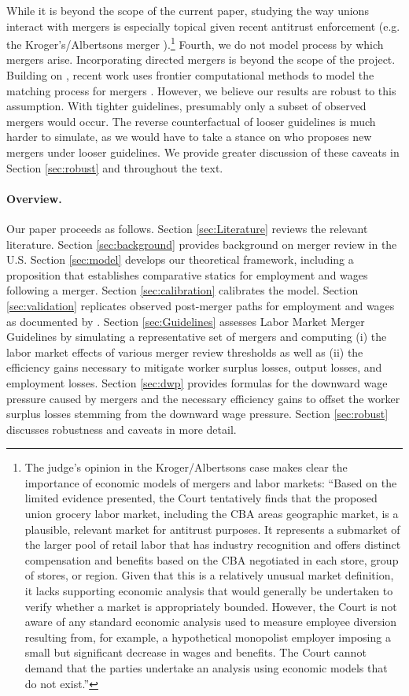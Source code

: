 \documentclass[12pt]{article}
\theoremstyle{prop}
\begin{document}
While it is beyond the scope of the current paper, studying the way unions interact with mergers is especially topical given recent antitrust enforcement (e.g. the Kroger's/Albertsons merger \citep{kroger2024}).\footnote{The judge's opinion in the Kroger/Albertsons case makes clear the importance of economic models of mergers and labor markets: ``Based on the limited evidence presented, the Court tentatively finds that the proposed union grocery labor market, including the CBA areas geographic market, is a plausible, relevant market for antitrust purposes. It represents a submarket of the larger pool of retail labor that has industry recognition and offers distinct compensation and benefits based on the CBA negotiated in each store, group of stores, or region. Given that this is a relatively unusual market definition, it lacks supporting economic analysis that would generally be undertaken to verify whether a market is appropriately bounded. However, the Court is not aware of any standard economic analysis used to measure employee diversion resulting from, for example, a hypothetical monopolist employer imposing a small but significant decrease in wages and benefits. The Court cannot demand that the parties undertake an analysis using economic models that do not exist.''}
Fourth, we do not model process by which mergers arise. Incorporating directed mergers is beyond the scope of the project. Building on \citet{david2021aggregate}, recent work uses frontier computational methods   to model the matching process for mergers \citep{ThomasJMP,FilipJMP}. However, we believe our results are robust to this assumption. With tighter guidelines, presumably only a subset of observed mergers would occur. The reverse counterfactual of looser guidelines is much harder to simulate, as we would have to take a stance on who proposes new mergers under looser guidelines.
We provide greater discussion of these caveats in Section  \ref{sec:robust} and throughout the text. 

\paragraph{Overview.}
Our paper proceeds as follows. 
Section \ref{sec:Literature} reviews the relevant literature.
Section \ref{sec:background} provides background on merger review in the U.S.
Section \ref{sec:model} develops our theoretical framework, including a proposition that establishes comparative statics for employment and wages following a merger. 
Section \ref{sec:calibration} calibrates the model.
Section \ref{sec:validation} replicates observed post-merger paths for employment and wages as documented by \citet{Arnold}. 
Section \ref{sec:Guidelines} assesses Labor Market Merger Guidelines by simulating a representative set of mergers and computing (i) the labor market effects of various merger review thresholds as well as (ii) the efficiency gains necessary to mitigate worker surplus losses, output losses, and employment losses.  
Section \ref{sec:dwp} provides formulas for the downward wage pressure caused by mergers and the necessary efficiency gains to offset the worker surplus losses stemming from the downward wage pressure. 
Section \ref{sec:robust} discusses robustness and caveats in more detail. 
\end{document}
